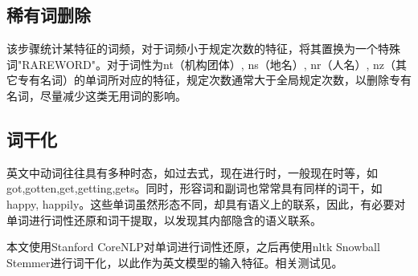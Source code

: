 \subsection{稀有词删除}
该步骤统计某特征的词频，对于词频小于规定次数的特征，将其置换为一个特殊词"RAREWORD"。对于词性为nt（机构团体）, ns（地名）, nr（人名）, nz（其它专有名词）的单词所对应的特征，规定次数通常大于全局规定次数，以删除专有名词，尽量减少这类无用词的影响。

\subsection{词干化}
英文中动词往往具有多种时态，如过去式，现在进行时，一般现在时等，如got,gotten,get,getting,gets。同时，形容词和副词也常常具有同样的词干，如happy, happily。这些单词虽然形态不同，却具有语义上的联系，因此，有必要对单词进行词性还原和词干提取，以发现其内部隐含的语义联系。\par
本文使用Stanford CoreNLP对单词进行词性还原，之后再使用nltk Snowball Stemmer进行词干化，以此作为英文模型的输入特征。相关测试见。